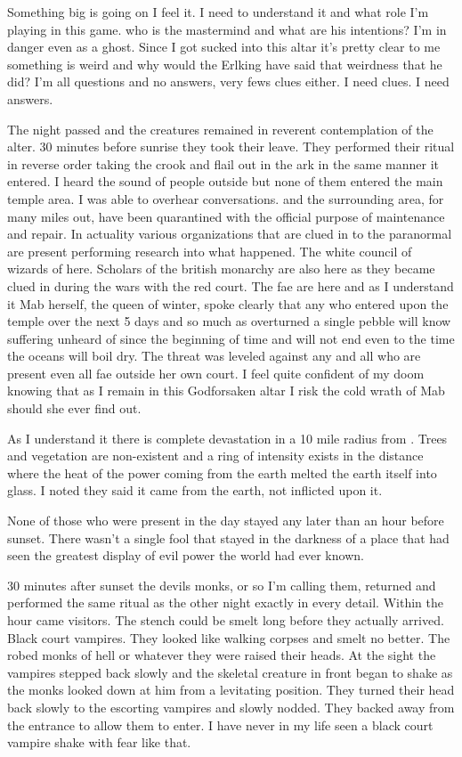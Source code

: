 
Something big is going on I feel it. I need to understand it and what role I'm playing in this game. who is the mastermind and what are his intentions? I'm in danger even as a ghost. Since I got sucked into this altar it's pretty clear to me something is weird and why would the Erlking have said that weirdness that he did? I'm all questions and no answers, very fews clues either. I need clues. I need answers.

The night passed and the creatures remained in reverent contemplation of the alter. 30 minutes before sunrise they took their leave. They performed their ritual in reverse order taking the crook and flail out in the ark in the same manner it entered. I heard the sound of people outside but none of them entered the main temple area. I was able to overhear conversations. \chichenitza* and the surrounding area, for many miles out, have been quarantined with the official purpose of maintenance and repair. In actuality various organizations that are clued in to the paranormal are present performing research into what happened. The white council of wizards of here. Scholars of the british monarchy are also here as they became clued in during the wars with the red court. The fae are here and as I understand it Mab herself, the queen of winter, spoke clearly that any who entered upon the temple over the next 5 days and so much as overturned a single pebble will know suffering unheard of since the beginning of time and will not end even to the time the oceans will boil dry. The threat was leveled against any and all who are present even all fae outside her own court. I feel quite confident of my doom knowing that as I remain in this Godforsaken altar I risk the cold wrath of Mab should she ever find out.

As I understand it there is complete devastation in a 10 mile radius from \chichenitza*. Trees and vegetation are non-existent and a ring of intensity exists in the distance where the heat of the power coming from the earth melted the earth itself into glass. I noted they said it came from the earth, not inflicted upon it. 

None of those who were present in the day stayed any later than an hour before sunset. There wasn't a single fool that stayed in the darkness of a place that had seen the greatest display of evil power the world had ever known.

30 minutes after sunset the devils monks, or so I'm calling them, returned and performed the same ritual as the other night exactly in every detail. Within the hour came visitors. The stench could be smelt long before they actually arrived. Black court vampires. They looked like walking corpses and smelt no better. The robed monks of hell or whatever they were raised their heads. At the sight the vampires stepped back slowly and the skeletal creature in front began to shake as the monks looked down at him from a levitating position. They turned their head back slowly to the escorting vampires and slowly nodded. They backed away from the entrance to allow them to enter. I have never in my life seen a black court vampire shake with fear like that. 


